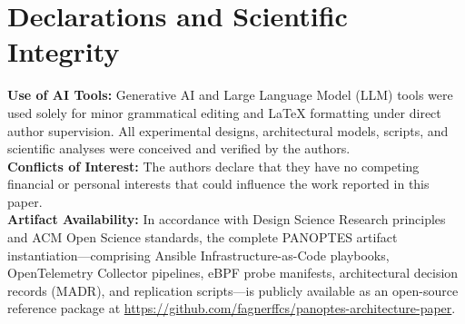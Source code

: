 \section*{Declarations and Scientific Integrity}
\label{sec:declarations}

\textbf{Use of AI Tools:} Generative AI and Large Language Model (LLM) tools were used solely for minor grammatical editing and LaTeX formatting under direct author supervision. All experimental designs, architectural models, scripts, and scientific analyses were conceived and verified by the authors. \\
\textbf{Conflicts of Interest:} The authors declare that they have no competing financial or personal interests that could influence the work reported in this paper. \\
\textbf{Artifact Availability:} In accordance with Design Science Research principles and ACM Open Science standards, the complete PANOPTES artifact instantiation—comprising Ansible Infrastructure-as-Code playbooks, OpenTelemetry Collector pipelines, eBPF probe manifests, architectural decision records (MADR), and replication scripts—is publicly available as an open-source reference package at \url{https://github.com/fagnerffcs/panoptes-architecture-paper}.
